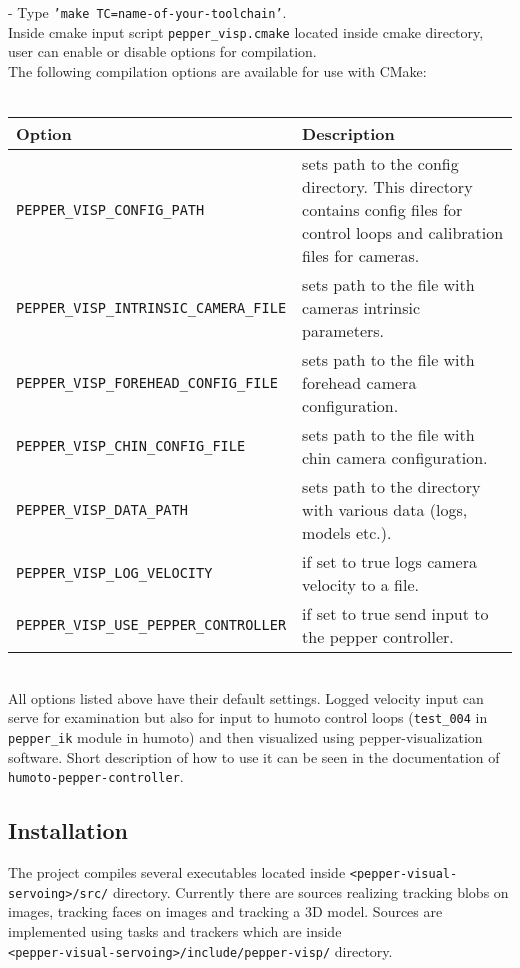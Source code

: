 - Type \texttt{'make TC=name-of-your-toolchain'}.\\

\noindent Inside cmake input script \texttt{pepper\_visp.cmake} located inside cmake directory, user can enable or disable
options for compilation.\\

\noindent The following compilation options are available for use with CMake:\\ \\
\begin{tabular}{|l|p{5cm}|}
\hline
Option & Description \\
\hline
\texttt{PEPPER\_VISP\_CONFIG\_PATH} & sets path to the config directory. This directory contains config files for
control loops and calibration files for cameras.\\
\hline
\texttt{PEPPER\_VISP\_INTRINSIC\_CAMERA\_FILE} & sets path to the file with cameras intrinsic parameters.\\ \hline
\texttt{PEPPER\_VISP\_FOREHEAD\_CONFIG\_FILE} & sets path to the file with forehead camera configuration. \\ \hline
\texttt{PEPPER\_VISP\_CHIN\_CONFIG\_FILE} & sets path to the file with chin camera configuration.\\ \hline
\texttt{PEPPER\_VISP\_DATA\_PATH} & sets path to the directory with various data (logs, models etc.).\\ \hline
\texttt{PEPPER\_VISP\_LOG\_VELOCITY} & if set to true logs camera velocity to a file.\\ \hline
\texttt{PEPPER\_VISP\_USE\_PEPPER\_CONTROLLER} & if set to true send input to the pepper controller.\\ \hline
\end{tabular} \\ 

\noindent All options listed above have their default settings. Logged velocity input can serve for examination but also 
for input to humoto control loops (\texttt{test\_004} in \texttt{pepper\_ik} module in humoto)
and then visualized using pepper-visualization software. Short description of how to use it can be seen in the
documentation of \texttt{humoto-pepper-controller}.\\

\subsection{Installation}
\noindent The project compiles several executables located inside \texttt{<pepper-visual-servoing>/src/} directory.  
Currently there are sources realizing tracking blobs on images, tracking faces on images and tracking a 3D model.
Sources are implemented using tasks and trackers which are inside \\
\texttt{<pepper-visual-servoing>/include/pepper-visp/} directory. \\

